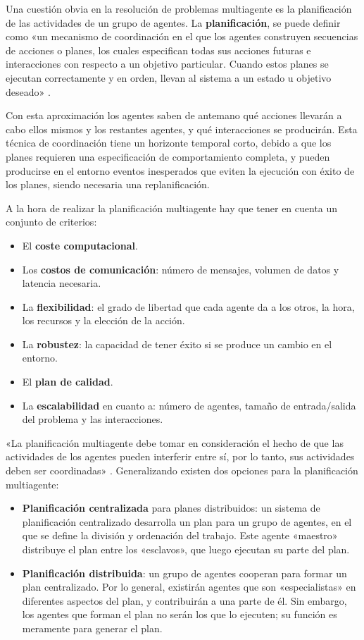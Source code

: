 Una cuestión obvia en la resolución de problemas multiagente es la planificación de las actividades de un grupo de agentes. La \textbf{planificación}, se puede definir como «un mecanismo de coordinación en el que los agentes construyen secuencias de acciones o planes, los cuales especifican todas sus acciones futuras e interacciones con respecto a un objetivo particular. Cuando estos planes se ejecutan correctamente y en orden, llevan al sistema a un estado u objetivo deseado» \cite{PLANIFICACION}. 

Con esta aproximación los agentes saben de antemano qué acciones llevarán a cabo ellos mismos y los restantes agentes, y qué interacciones se producirán. Esta técnica de coordinación tiene un horizonte temporal corto, debido a que los planes requieren una especificación de comportamiento completa, y pueden producirse en el entorno eventos inesperados que eviten la ejecución con éxito de los planes, siendo necesaria una replanificación.

A la hora de realizar la planificación multiagente hay que tener en cuenta un conjunto de criterios:
\begin{itemize}
\item El \textbf{coste computacional}.
\item Los \textbf{costos de comunicación}: número de mensajes, volumen de datos y latencia necesaria.
\item La \textbf{flexibilidad}: el grado de libertad que cada agente da a los otros, la hora, los recursos y la elección de la acción.
\item La \textbf{robustez}: la capacidad de tener éxito si se produce un cambio en el entorno.
\item El \textbf{plan de calidad}.
\item La \textbf{escalabilidad} en cuanto a: número de agentes, tamaño de entrada/salida del problema y las interacciones.
\end{itemize}

«La planificación multiagente debe tomar en consideración el hecho de que las actividades de los agentes pueden interferir entre sí, por lo tanto, sus actividades deben ser coordinadas» \cite{PLANIFICACION3}. Generalizando existen dos opciones para la planificación multiagente:

\begin{itemize}
\item \textbf{Planificación centralizada} para planes distribuidos: un sistema de planificación centralizado desarrolla un plan para un grupo de agentes, en el que se define la división y ordenación del trabajo. Este agente «maestro» distribuye el plan entre los «esclavos», que luego ejecutan su parte del plan.
\item \textbf{Planificación distribuida}: un grupo de agentes cooperan para formar un plan centralizado. Por lo general, existirán agentes que son «especialistas» en diferentes aspectos del plan, y contribuirán a una parte de él. Sin embargo, los agentes que forman el plan no serán los que lo ejecuten; su función es meramente para generar el plan.	
\end{itemize}

